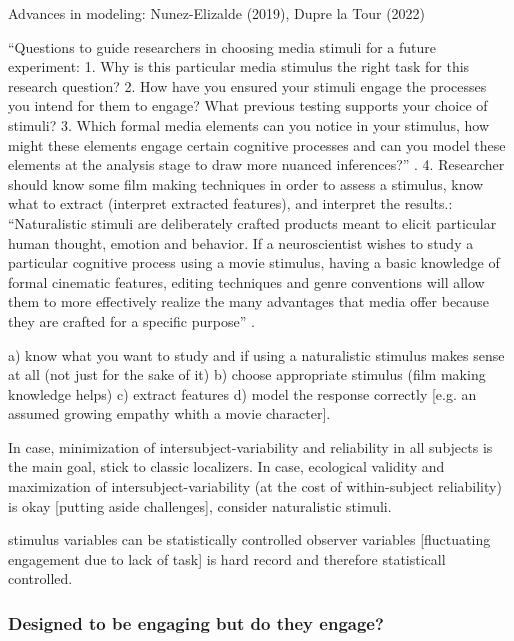 Advances in modeling: Nunez-Elizalde (2019), Dupre la Tour (2022)


%
``Questions to guide researchers in choosing media stimuli for a future
experiment:
%
1. Why is this particular media stimulus the right task for this research
question?
%
2. How have you ensured your stimuli engage the processes you intend for them to
engage? What previous testing supports your choice of stimuli?
%
3. Which formal media elements can you notice in your stimulus, how might these
elements engage certain cognitive processes and can you model these elements at
the analysis stage to draw more nuanced inferences?''
\citep{grall2022leveraging}.
%
4. Researcher should know some film making techniques in order to assess a
stimulus, know what to extract (interpret extracted features), and interpret the
results.: ``Naturalistic stimuli are deliberately crafted products meant to
elicit particular human thought, emotion and behavior.
%
If a neuroscientist wishes to study a particular cognitive process using a movie
stimulus, having a basic knowledge of formal cinematic features, editing
techniques and genre conventions will allow them to more effectively realize the
many advantages that media offer because they are crafted for a specific
purpose'' \citep{grall2022leveraging}.

%
a) know what you want to study and if using a naturalistic stimulus makes sense
at all (not just for the sake of it)
%
b) choose appropriate stimulus (film making knowledge helps)
%
c) extract features
%
d) model the response correctly [e.g. an assumed growing empathy whith a movie
character].

In case, minimization of intersubject-variability and reliability in all
subjects is the main goal, stick to classic localizers.
%
In case, ecological validity and maximization of intersubject-variability (at
the cost of within-subject reliability) is okay [putting aside challenges],
consider naturalistic stimuli.

stimulus variables can be statistically controlled
observer variables [fluctuating engagement due to lack of task] is hard record
and therefore statisticall controlled.


\subsubsection{Designed to be engaging but do they engage?}


